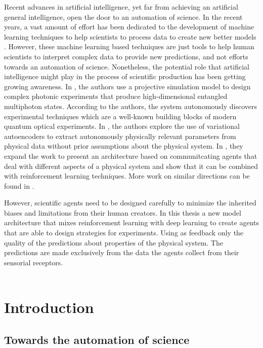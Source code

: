 \documentclass[11pt,a4paper,twoside]{report}
\newcommand{\+}{\textnormal{+} }
\theoremstyle{definition}
\numberwithin{equation}{chapter}
\begin{document}
Recent advances in artificial intelligence, yet far from achieving an artificial
general intelligence, open the door to an automation of science. In the recent
years, a vast amount of effort has been dedicated to the development of machine
learning techniques to help scientists to process data to create new better
models \cite{Carleo_2019}. However, these machine learning based techniques are
just tools to help human scientists to interpret complex data to provide new
predictions, and not efforts towards an automation of science. Nonetheless, the
potential role that artificial intelligence might play in the process of
scientific production has been getting growing awareness. In
\cite{Melnikov_2018}, the authors use a projective simulation model to design
complex photonic experiments that produce high-dimensional entangled multiphoton
states. According to the authors, the system autonomously discovers experimental
techniques which are a well-known building blocks of modern quantum optical
experiments. In \cite{iten2020discovering}, the authors explore the use of
variational autoencoders to extract autonomously physically relevant parameters
from physical data without prior assumptions about the physical system. In
\cite{nautrup2020operationally}, they expand the work to present an architecture
based on communitcating agents that deal with different aspects of a physical
system and show that it can be combined with reinforcement learning techniques.
More work on similar directions can be found in
\cite{ried2019minimal,Wu_2019,De_Simone_2019,
PhysRevD.99.015014,rahaman2019learning}.
\par
However, scientific agents need to be designed carefully to minimize the
inherited biases and limitations from their human creators. In this thesis a new
model architecture that mixes reinforcement learning with deep learning to
create agents that are able to design strategies for experiments. Using as
feedback only the quality of the predictions about properties of the physical
system. The predictions are made exclusively from the data the agents collect
from their sensorial receptors. \\
\\

\vspace{12mm}


\chapter{Introduction} \label{Introduction}
\section{Towards the automation of science}
\end{document}
